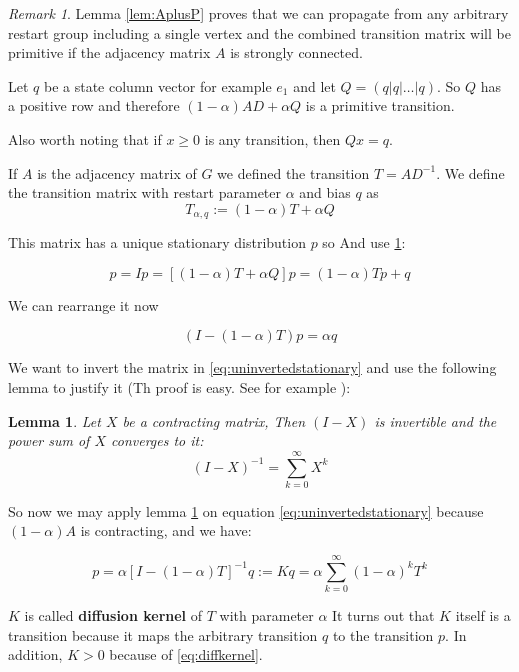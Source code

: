 \documentclass[a4paper,10pt]{article}
\newcommand{\gt}{>}
\theoremstyle{definition}
\theoremstyle{remark}
\newtheorem{remark}{Remark}
\theoremstyle{plain}
\newtheorem{lemma}{Lemma}[section]
\begin{document}
\begin{remark}
\label{rem:AplusP}
Lemma \ref{lem:AplusP} proves that we can propagate from any arbitrary restart
group including a single vertex and the combined transition matrix will be
primitive if the adjacency matrix $A$ is strongly connected.

Let $q$ be a state column vector for example $e_1$ and let $Q = (q | q | \dots | q)$.
So $Q$ has a positive row and therefore $(1-\alpha)AD + \alpha Q$ is a primitive
transition.

Also worth noting that if $x \geq 0$ is any transition, then $Qx = q$.
\end{remark}

If $A$ is the adjacency matrix of $G$ we defined the transition $T = AD^{-1}$.
We define the transition matrix with restart parameter $\alpha$ and bias $q$ as
\[
T_{\alpha, q} :=
(1 - \alpha)T + \alpha Q
\]

This matrix has a unique stationary distribution $p$ so
And use \ref{rem:AplusP}:

\[
p = Ip
= [(1 - \alpha)T + \alpha Q]p =  (1 - \alpha)Tp + q 
\]

We can rearrange it now

\begin{equation}
\label{eq:uninvertedstationary}
(I - (1 - \alpha)T)p = \alpha q
\end{equation}

We want to invert the matrix in \ref{eq:uninvertedstationary} and use the
following lemma to justify it (Th proof is easy. See for example
\textcite{serre2010matrices}):

\begin{lemma}
\label{lem:invertible}
Let $X$ be a contracting matrix, Then $(I-X)$ is invertible and the power sum of
$X$ converges to it:
\[
(I - X)^{-1} = \sum_{k=0}^{\infty} X^k
\]
\end{lemma}

So now we may apply lemma \ref{lem:invertible} on equation
\ref{eq:uninvertedstationary} because $(1-\alpha)A$ is contracting, and we have:

\begin{equation}
\label{eq:diffkernel}
p = \alpha [I - (1 - \alpha)T]^{-1} q := K q = 
\alpha \sum_{k=0}^{\infty} (1 - \alpha)^k T^k
\end{equation}

$K$ is called \textbf{diffusion kernel} of $T$ with parameter $\alpha$
It turns out that $K$ itself is a transition because it maps the
arbitrary transition $q$ to the transition $p$. In addition, $K \gt 0$ because
of \ref{eq:diffkernel}.
\end{document}
